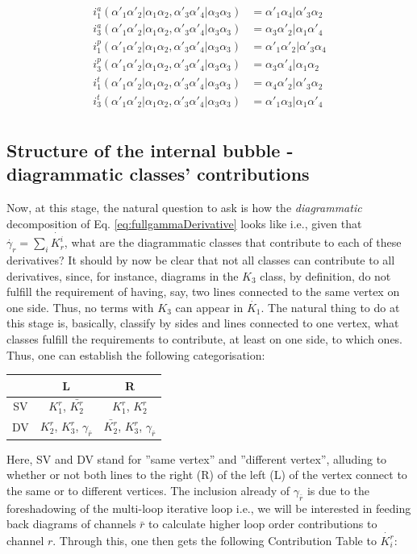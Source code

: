 \documentclass[12pt,a4paper,roman]{article}
\begin{document}
\begin{align}
i_1^a (\alpha'_1\alpha'_2|\alpha_1\alpha_2, \alpha'_3\alpha'_4|\alpha_3\alpha_3) &= \alpha'_1\alpha_4| \alpha'_3\alpha_2 \\
i_3^a (\alpha'_1\alpha'_2|\alpha_1\alpha_2, \alpha'_3\alpha'_4|\alpha_3\alpha_3) &= \alpha_3\alpha'_2| \alpha_1\alpha'_4 \\
i_1^p (\alpha'_1\alpha'_2|\alpha_1\alpha_2, \alpha'_3\alpha'_4|\alpha_3\alpha_3) &= \alpha'_1\alpha'_2| \alpha'_3\alpha_4 \\
i_3^p (\alpha'_1\alpha'_2|\alpha_1\alpha_2, \alpha'_3\alpha'_4|\alpha_3\alpha_3) &= \alpha_3\alpha'_4| \alpha_1\alpha_2 \\
i_1^t (\alpha'_1\alpha'_2|\alpha_1\alpha_2, \alpha'_3\alpha'_4|\alpha_3\alpha_3) &= \alpha_4\alpha'_2| \alpha'_3\alpha_2 \\
i_3^t (\alpha'_1\alpha'_2|\alpha_1\alpha_2, \alpha'_3\alpha'_4|\alpha_3\alpha_3) &= \alpha'_1\alpha_3| \alpha_1\alpha'_4 \\
\end{align}
\subsection*{Structure of the internal bubble - diagrammatic classes' contributions}
Now, at this stage, the natural question to ask is how the \textit{diagrammatic} decomposition of Eq. \ref{eq:fullgammaDerivative} looks like i.e., given that $\dot{\gamma_r} = \sum_i \dot{K_r^i}$, what are the diagrammatic classes that contribute to each of these derivatives? It should by now be clear that not all classes can contribute to all derivatives, since, for instance, diagrams in the $K_3$ class, by definition, do not fulfill the requirement of having, say, two lines connected to the same vertex on one side. Thus, no terms with $K_3$ can appear in $\dot{K_1}$.
The natural thing to do at this stage is, basically, classify by sides and lines connected to one vertex, what classes fulfill the requirements to contribute, at least on one side, to which ones.
Thus, one can establish the following categorisation:

\begin{center}
\begin{tabular}{| c| | c | c|} 
\hline
          &  L & R \\ 
          \hline\hline
 SV   & $K_1^r$, $\bar{K_2^r}$ &  $K_1^r$, $K_2^r$\\ 
  DV & $K_2^r$, $K_3^r$, $\gamma_{\bar{r}}$  & $\bar{K_2^r}$, $K_3^r$, $\gamma_{\bar{r}}$\\ 
 \hline
\end{tabular}
\end{center}
Here, SV and DV stand for ''same vertex'' and ''different vertex'', alluding to whether or not both lines to the right (R) of the left (L) of the vertex connect to the same or to different vertices. The inclusion already of $\gamma_{\bar{r}}$ is due to the foreshadowing of the multi-loop iterative loop i.e., we will be interested in feeding back diagrams of channels $\bar{r}$ to calculate higher loop order contributions to channel $r$.
Through this, one then gets the following Contribution Table to $\dot{K_i^r}$:
\end{document}
